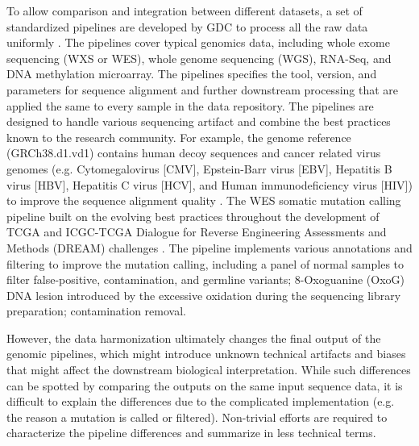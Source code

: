 To allow comparison and integration between different datasets, a set of standardized pipelines are developed by GDC to process all the raw data uniformly \cite{grossmanrl_staudtlm:SharedVision2016,zhangz_grossmanrl:UniformGenomic2021}. The pipelines cover typical genomics data, including whole exome sequencing (WXS or WES), whole genome sequencing (WGS), RNA-Seq, and DNA methylation microarray. The pipelines specifies the tool, version, and parameters for sequence alignment and further downstream processing that are applied the same to every sample in the data repository. The pipelines are designed to handle various sequencing artifact and combine the best practices known to the research community. For example, the genome reference (GRCh38.d1.vd1) contains human decoy sequences and cancer related virus genomes (e.g. Cytomegalovirus [CMV], Epstein-Barr virus [EBV], Hepatitis B virus [HBV], Hepatitis C virus [HCV], and Human immunodeficiency virus [HIV]) to improve the sequence alignment quality \cite{zhangz_grossmanrl:UniformGenomic2021}. The WES somatic mutation calling pipeline built on the evolving best practices throughout the development of TCGA and ICGC-TCGA Dialogue for Reverse Engineering Assessments and Methods (DREAM) challenges \cite{ewingad_boutrospc:CombiningTumor2015,ellrottk_tcga:MC3MutationCalling2018}. The pipeline implements various annotations and filtering to improve the mutation calling, including a panel of normal samples to filter false-positive, contamination, and germline variants; 8-Oxoguanine (OxoG) DNA lesion introduced by the excessive oxidation during the sequencing library preparation; contamination removal.

However, the data harmonization ultimately changes the final output of the genomic pipelines, which might introduce unknown technical artifacts and biases that might affect the downstream biological interpretation. While such differences can be spotted by comparing the outputs on the same input sequence data, it is difficult to explain the differences due to the complicated implementation (e.g. the reason a mutation is called or filtered). Non-trivial efforts are required to characterize the pipeline differences and summarize in less technical terms.


